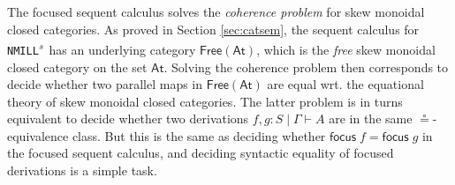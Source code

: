 \documentclass[submission,copyright,creativecommons]{eptcs}
\theoremstyle{definition}
\newcommand{\NMILL}{\texttt{NMILL}}
\newcommand{\SkNMILL}{\NMILL\textsuperscript{\textit{s}}}
\newcommand{\FSkMCC}{\textsf{Free}}
\begin{document}
The focused sequent calculus solves the \emph{coherence problem} for skew monoidal closed categories.
As proved in Section \ref{sec:catsem}, the sequent calculus for \SkNMILL\ has an underlying category $\FSkMCC(\mathsf{At})$, which is the \emph{free} skew monoidal closed category on the set $\mathsf{At}$. Solving the coherence problem then corresponds to decide whether two parallel maps in $\FSkMCC(\mathsf{At})$ are equal wrt. the equational theory of skew monoidal closed categories. The latter problem is in turns equivalent to decide whether two derivations $f,g : S \mid \Gamma \vdash A$ are in the same $\circeq$-equivalence class. But this is the same as deciding whether $\mathsf{focus}\;f = \mathsf{focus}\;g$ in the focused sequent calculus, and deciding syntactic equality of focused derivations is a simple task.


\end{document}
